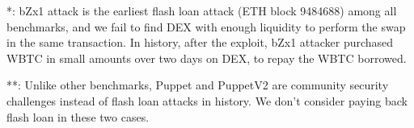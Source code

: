 \begin{table}[t]
\begin{tabular}{|l|l|l|l|l|lll|}
    \end{tabular}
    \flushleft
    \scriptsize{
    *: bZx1 attack is the earliest flash loan attack (ETH block 9484688) among all benchmarks, 
    and we fail to find DEX with enough liquidity to perform the swap in the same transaction. 
    In history, after the exploit, bZx1 attacker purchased WBTC in small amounts over two days on DEX, 
    to repay the WBTC borrowed.   

    **: Unlike other benchmarks, Puppet and PuppetV2 are community security challenges instead of 
    flash loan attacks in history. We don't consider paying back flash loan in these two cases. 
    }  

\end{table}